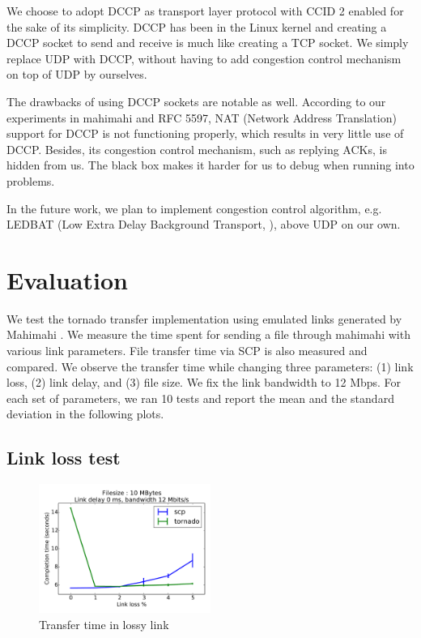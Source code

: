 \documentclass{sig-alternate-10pt}
\begin{document}
We choose to adopt DCCP as transport layer protocol with CCID 2 enabled for the
sake of its simplicity. DCCP has been in the Linux kernel and creating a DCCP
socket to send and receive is much like creating a TCP socket. We simply replace
UDP with DCCP, without having to add congestion control mechanism on top of UDP
by ourselves.

The drawbacks of using DCCP sockets are notable as well. According to our
experiments in mahimahi and RFC 5597, NAT (Network Address Translation) support
for DCCP is not functioning properly, which results in very little use of DCCP.
Besides, its congestion control mechanism, such as replying ACKs, is hidden from
us. The black box makes it harder for us to debug when running into problems.

In the future work, we plan to implement congestion control algorithm, e.g.
LEDBAT (Low Extra Delay Background Transport, \cite{ledbat}), above UDP on our own.

\section{Evaluation} \label{s:eval}
We test the tornado transfer implementation using emulated links generated by
Mahimahi \cite{mahimahi}. We measure the time spent for sending a file through
mahimahi with various link parameters. File transfer time via SCP is also
measured and compared. We observe the transfer time while changing three
parameters: (1) link loss, (2) link delay, and (3) file size. We fix the link
bandwidth to 12 Mbps. For each set of parameters, we ran 10 tests and report the
mean and the standard deviation in the following plots.

\subsection{Link loss test}

\begin{figure}[t]
  \centering
  \includegraphics[width=0.5\textwidth]{loss-plot}
  \caption{Transfer time in lossy link}
  \label{f:loss-plot}
\end{figure}
\end{document}
